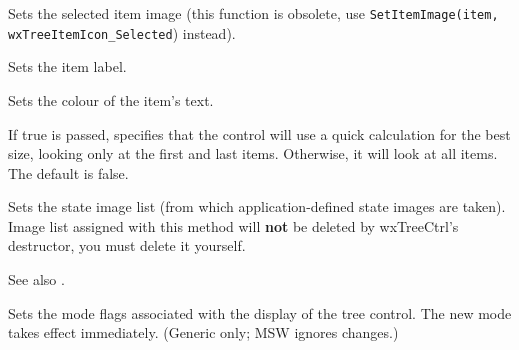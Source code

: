 
Sets the selected item image (this function is obsolete, use {\tt SetItemImage(item, wxTreeItemIcon\_Selected}) instead).


\label{wxtreectrlsetitemtext}


Sets the item label.


\label{wxtreectrlsetitemtextcolour}


Sets the colour of the item's text.


\label{wxtreectrlsetquickbestsize}


If true is passed, specifies that the control will use a quick calculation for the best size,
looking only at the first and last items. Otherwise, it will look at all items.
The default is false.




\label{wxtreectrlsetstateimagelist}


Sets the state image list (from which application-defined state images are taken).
Image list assigned with this method will
{\bf not} be deleted by wxTreeCtrl's destructor, you must delete it yourself.

See also .

\label{wxtreectrlsetwindowstyle}


Sets the mode flags associated with the display of the tree control.
The new mode takes effect immediately.
(Generic only; MSW ignores changes.)


\label{wxtreectrlsortchildren}

